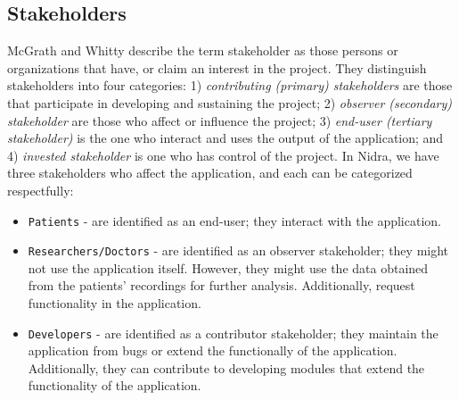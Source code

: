 \subsection{Stakeholders}
McGrath and Whitty \cite{stakeholderdefined} describe the term stakeholder as those persons or organizations that have, or claim an interest in the project. They distinguish stakeholders into four categories: 1) \textit{contributing (primary) stakeholders} are those that participate in developing and sustaining the project; 2) \textit{observer (secondary) stakeholder} are those who affect or influence the project;  3) \textit{end-user (tertiary stakeholder)} is the one who interact and uses the output of the application; and 4) \textit{invested stakeholder} is one who has control of the project. In Nidra, we have three stakeholders who affect the application, and each can be categorized respectfully:
\begin{itemize}
    \item \verb|Patients| - are identified as an end-user; they interact with the application.  
    \item \verb|Researchers/Doctors| - are identified as an observer stakeholder; they might not use the application itself. However, they might use the data obtained from the patients' recordings for further analysis. Additionally, request functionality in the application.
    \item \verb|Developers| - are identified as a contributor stakeholder; they maintain the application from bugs or extend the functionally of the application. Additionally, they can contribute to developing modules that extend the functionality of the application. 
\end{itemize}
